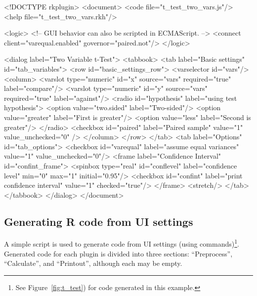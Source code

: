 \begin{footnotesize}
\begin{Code}
<!DOCTYPE rkplugin>
<document>
  <code file="t_test_two_vars.js"/>
  <help file="t_test_two_vars.rkh"/>

  <logic>
    <!-- GUI behavior can also be scripted in ECMAScript. -->
    <connect client="varequal.enabled" governor="paired.not"/>
  </logic>

  <dialog label="Two Variable t-Test">
    <tabbook>
      <tab label="Basic settings" id="tab_variables">
        <row id="basic_settings_row">
          <varselector id="vars"/>
          <column>
            <varslot type="numeric" id="x" source="vars" required="true"
              label="compare"/>                                                             
            <varslot type="numeric" id="y" source="vars" required="true"
              label="against"/>
            <radio id="hypothesis" label="using test hypothesis">
              <option value="two.sided" label="Two-sided"/>
              <option value="greater" label="First is greater"/>
              <option value="less" label="Second is greater"/>
            </radio>
            <checkbox id="paired" label="Paired sample" value="1" value_unchecked="0" />
          </column>
        </row>
      </tab>
      <tab label="Options" id="tab_options">
        <checkbox id="varequal" label="assume equal variances" value="1"
          value_unchecked="0"/>
        <frame label="Confidence Interval" id="confint_frame">
          <spinbox type="real" id="conflevel" label="confidence level" min="0" max="1"
            initial="0.95"/>
          <checkbox id="confint" label="print confidence interval" value="1"
            checked="true"/>
        </frame>
        <stretch/>
      </tab>
    </tabbook>
  </dialog>
</document>
\end{Code}
\end{footnotesize}

\subsection{Generating R code from UI settings}
\label{sec:generating_r_code_from_ui_settings}
A simple  script is used to generate  code from UI settings (using  commands)\footnote{
  See Figure~\ref{fig:t_test}) for code generated in this example.
}. Generated code for each plugin is divided into three sections: ``Preprocess'', ``Calculate'', and ``Printout'', although each
may be empty.

